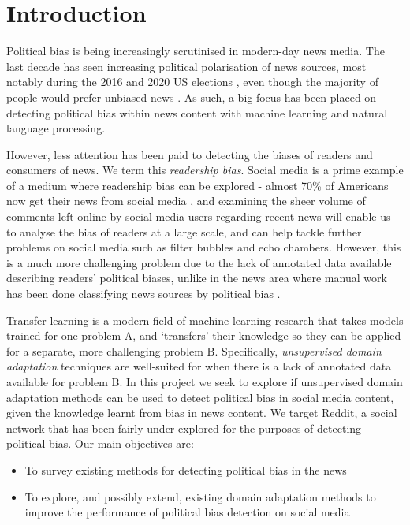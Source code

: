 \chapter{Introduction}

Political bias is being increasingly scrutinised in modern-day news media. The last decade has seen increasing political polarisation of news sources, most notably during the 2016 and 2020 US elections \cite{us-election}, even though the majority of people would prefer unbiased news \cite{pew-unbiased}. As such, a big focus has been placed on detecting political bias within news content with machine learning and natural language processing.

However, less attention has been paid to detecting the biases of readers and consumers of news. We term this \textit{readership bias}. Social media is a prime example of a medium where readership bias can be explored - almost 70\% of Americans now get their news from social media \cite{pew-social-media-news-2018}, and examining the sheer volume of comments left online by social media users regarding recent news will enable us to analyse the bias of readers at a large scale, and can help tackle further problems on social media such as filter bubbles and echo chambers. However, this is a much more challenging problem due to the lack of annotated data available describing readers' political biases, unlike in the news area where manual work has been done classifying news sources by political bias \cite{mbfc} \cite{media-bias-chart}.

Transfer learning is a modern field of machine learning research that takes models trained for one problem A, and `transfers' their knowledge so they can be applied for a separate, more challenging problem B. Specifically, \textit{unsupervised domain adaptation} techniques are 
well-suited for when there is a lack of annotated data available for problem B. In this project we seek to explore if unsupervised domain adaptation methods can be used to detect political bias in social media content, given the knowledge learnt from bias in news content. We target Reddit, a social network that has been fairly under-explored for the purposes of detecting political bias. Our main objectives are:

\begin{itemize}
    \item To survey existing methods for detecting political bias in the news
    \item To explore, and possibly extend, existing domain adaptation methods to improve the performance of political bias detection on social media
\end{itemize}

